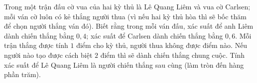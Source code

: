 \begin{bt}%
	Trong một trận đấu cờ vua của hai kỳ thủ là Lê Quang Liêm và vua cờ Carlsen; mỗi ván cờ luôn có kẻ thắng người thua (vì nếu hai kỳ thủ hòa thì sẽ bốc thăm để chọn người thắng ván đó). Biết rằng trong mỗi ván đấu, xác suất để anh Liêm dành chiến thắng bằng $0{,}4$; xác suất để Carlsen dành chiến thắng bằng $0{,}6$. Mỗi trận thắng được tính $1$ điểm cho kỳ thủ, người thua không được điểm nào. Nếu người nào tạo được cách biệt $2$ điểm thì sẽ dành chiến thắng chung cuộc. Tính xác suất để Lê Quang Liêm là người chiến thắng sau cùng (làm  tròn đến hàng phần trăm).
\end{bt}

